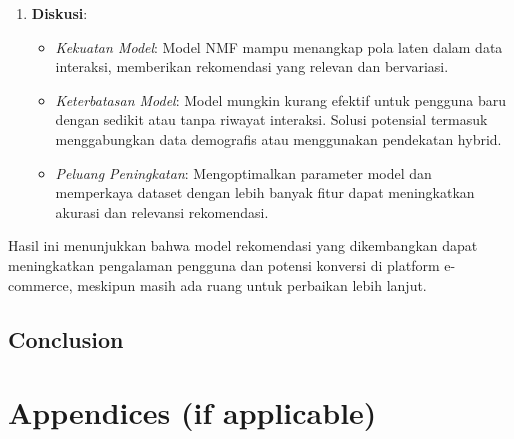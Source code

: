 \documentclass[journal,article,submit,pdftex,moreauthors]{Definitions/mdpi}
\begin{document}
\begin{enumerate}
    \item \textbf{Diskusi}:
    \begin{itemize}
        \item \textit{Kekuatan Model}: Model NMF mampu menangkap pola laten dalam data interaksi, memberikan rekomendasi yang relevan dan bervariasi.
        \item \textit{Keterbatasan Model}: Model mungkin kurang efektif untuk pengguna baru dengan sedikit atau tanpa riwayat interaksi. Solusi potensial termasuk menggabungkan data demografis atau menggunakan pendekatan hybrid.
        \item \textit{Peluang Peningkatan}: Mengoptimalkan parameter model dan memperkaya dataset dengan lebih banyak fitur dapat meningkatkan akurasi dan relevansi rekomendasi.
    \end{itemize}
\end{enumerate}

Hasil ini menunjukkan bahwa model rekomendasi yang dikembangkan dapat meningkatkan pengalaman pengguna dan potensi konversi di platform e-commerce, meskipun masih ada ruang untuk perbaikan lebih lanjut.


\subsection{Conclusion}

\section{Appendices (if applicable)}

\end{document}
